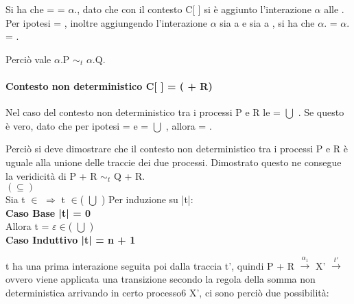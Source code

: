 Si ha che  =  = $\alpha$., dato che con il contesto C[ ] si è aggiunto l'interazione $\alpha$ alle . Per ipotesi  = , inoltre aggiungendo l'interazione $\alpha$ sia a  e sia a , si ha che $\alpha$. = $\alpha$. = .

Perciò vale $\alpha$.P $\sim_{t}$ $\alpha$.Q.

\paragraph{Contesto non deterministico  C[ ] = (\hspace{0.3cm} + R)} \mbox{}

Nel caso del contesto non deterministico tra i processi P e R le  =  $\bigcup$ . Se questo è vero, dato che per ipotesi  =  e  =  $\bigcup$ , allora  =  .

Perciò si deve dimostrare che il contesto non deterministico tra i processi P e R è uguale alla unione delle traccie dei due processi. Dimostrato questo ne consegue la veridicità di P + R $\sim_{t}$ Q + R.\\

$(\subseteq)$ \\

Sia t $\in$  $\Rightarrow$  t $\in$( $\bigcup$ )
Per induzione su |t|:
\\

\textbf{Caso Base |t| = 0}
\\
Allora t = $\varepsilon \in$( $\bigcup$ )
\\

\textbf{Caso Induttivo |t| = n + 1}

t ha una prima interazione seguita poi dalla traccia t', quindi P + R $ \overset{\alpha_{1}}\rightarrow $ X' $\overset{t'}\rightarrow$ ovvero viene applicata una transizione secondo la regola della somma non deterministica arrivando in certo processo6 X', ci sono perciò due possibilità:

